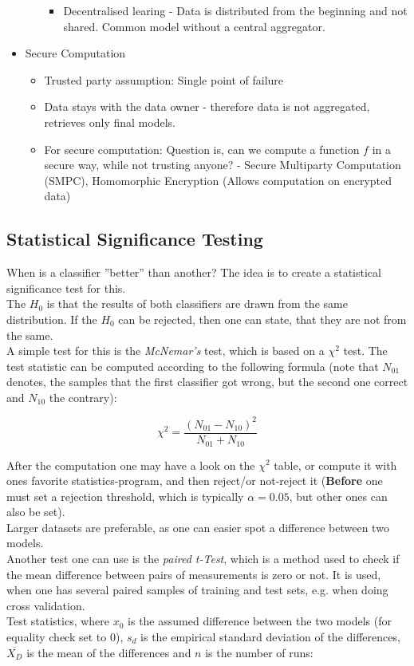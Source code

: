 \documentclass[12pt,a4paper]{article}
\begin{document}
\begin{itemize}
\begin{itemize}
\begin{itemize}
                    \item Decentralised learing - Data is distributed from the beginning and not shared. Common model without a central aggregator.
                \end{itemize}
        \end{itemize}
    \item Secure Computation
        \begin{itemize}
            \item Trusted party assumption: Single point of failure
            \item Data stays with the data owner - therefore data is not aggregated, retrieves only final models.
            \item For secure computation: Question is, can we compute a function \(f\) in a secure way, while not trusting anyone? - Secure Multiparty Computation (SMPC), Homomorphic Encryption (Allows computation on encrypted data)
        \end{itemize}
\end{itemize}

\subsection{Statistical Significance Testing}

\noindent When is a classifier ''better'' than another? The idea is to create a statistical significance test for this.\\
The \(H_0\) is that the results of both classifiers are drawn from the same distribution. If the \(H_0\) can be rejected, then one can state, that they are not from the same.\\
A simple test for this is the \textit{McNemar's} test, which is based on a \(\chi^2\) test. The test statistic can be computed according to the following formula (note that \(N_{01}\) denotes, the samples that the first classifier got wrong, but the second one correct and \(N_{10}\) the contrary):

\[\chi^2 = \frac{(N_{01} - N_{10})^2}{N_{01} + N_{10}}\]

\noindent After the computation one may have a look on the \(\chi^2\) table, or compute it with ones favorite statistics-program, and then reject/or not-reject it (\textbf{Before} one must set a rejection threshold, which is typically \(\alpha = 0.05\), but other ones can also be set).\\
Larger datasets are preferable, as one can easier spot a difference between two models.\\[1em]
Another test one can use is the \textit{paired t-Test}, which is a method used to check if the mean difference between pairs of measurements is zero or not. It is used, when one has several paired samples of training and test sets, e.g. when doing cross validation.\\
Test statistics, where \(x_0\) is the assumed difference between the two models (for equality check set to 0), \(s_d\) is the empirical standard deviation of the differences, \(\overline{X_D}\) is the mean of the differences and \(n\) is the number of runs:
\end{document}
